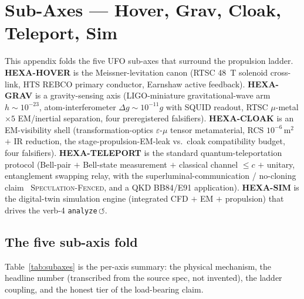 \section{Sub-Axes --- Hover, Grav, Cloak, Teleport, Sim}
\label{app:subaxes}

This appendix folds the five UFO sub-axes that surround the propulsion
ladder. \textbf{HEXA-HOVER} is the Meissner-levitation canon
(RTSC \SI{48}{\tesla} solenoid cross-link, HTS REBCO primary conductor,
Earnshaw \citep{earnshaw1842} active feedback). \textbf{HEXA-GRAV} is a
gravity-sensing axis (LIGO-miniature gravitational-wave arm
$h\!\sim\!10^{-23}$, atom-interferometer $\Delta g\!\sim\!10^{-11}g$ with
SQUID readout, RTSC $\mu$-metal $\times5$ EM/inertial separation, four
preregistered falsifiers). \textbf{HEXA-CLOAK} is an EM-visibility shell
(transformation-optics $\varepsilon$-$\mu$ tensor metamaterial,
RCS $10^{-6}$\,m$^2$ $+$ IR reduction, the stage-propulsion-EM-leak vs.\
cloak compatibility budget, four falsifiers). \textbf{HEXA-TELEPORT} is
the standard quantum-teleportation protocol (Bell-pair $+$ Bell-state
measurement $+$ classical channel $\le c$ $+$ unitary, entanglement
swapping relay, with the superluminal-communication / no-cloning claim
\tierWhite\ \textsc{Speculation-Fenced}, and a QKD BB84/E91 application).
\textbf{HEXA-SIM} is the digital-twin simulation engine (integrated CFD
$+$ EM $+$ propulsion) that drives the verb-4 \texttt{analyze}\,$\circlearrowleft$.

\subsection{The five sub-axis fold}
\label{app:subaxes-table}

Table~\ref{tab:subaxes} is the per-axis summary: the physical mechanism,
the headline number (transcribed from the source spec, not invented), the
ladder coupling, and the honest tier of the load-bearing claim.

